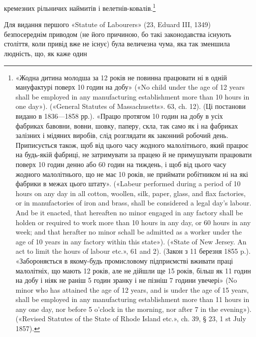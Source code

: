 кремезних рільничих наймитів і велетнів-ковалів.\footnote{
«Жодна дитина молодша за 12 років не повинна працювати ні в
одній мануфактурі поверх 10 годин на добу» («No child under the age
of 12 years shall be employed in any manufacturing establishment more
than 10 hours in one day»). («General Statutes of Massachusetts». 63, ch. 12).
(Ці постанови видано в 1836—1858 рр.). «Працю протягом 10 годин на
добу в усіх фабриках бавовни, вовни, шовку, паперу, скла, так само як
і на фабриках залізних і мідяних виробів, слід розглядати як законний
робочий день. Приписується також, щоб від цього часу жодного малолітнього,
який працює на будь-якій фабриці, не затримувати за працею й
не примушувати працювати поверх 10 годин денно або 60 годин на тиждень,
і щоб від цього часу жодного малолітнього, що не має 10 років, не приймати
робітником ні на які фабрики в межах цього штату». («Labeur performed
during a period of 10 hours on any day in all cotton, woollen, silk,
paper, glass, and flax factories, or in manufactories of iron and brass,
shall be considered a legal day’s labour. And be it enacted, that hereaften
no minor engaged in any factory shall be holden or required to work more
than 10 hours in any day, or 60 hours in any week; and that herafter no
minor schall be admitted as a worker under the age of 10 years in any factory
within this state»). («State of New Jersey. An act to limit the hours of labour
etc.», 61 and 2). (Закон з 11 березня 1855 p.). «Забороняється в якому-будь
промисловому підприємстві вживати праці малолітніх, що мають
12 років, але не дійшли ще 15 років, більш як 11 годин на добу і ніяк не
раніш 5 годин зранку і не пізніш 7 години увечері» (No minor who has
attained the age of 12 years, and is under the age of 15 years, shall be employed
in any manufacturing establishment more than 11 hours in any one day,
nor before 5 o’clock in the morning, nor after 7 in the evening»). («Revised
Statutes of the State of Rhode Island etc.», ch. 39, § 23, 1 st July 1857).
}

Для видання першого «Statute of Labourers» (23, Eduard
III, 1349) безпосереднім приводом (не його причиною, бо такі
законодавства існують століття, коли привід вже не існує) була
величезна чума, яка так зменшила людність, що, як каже один
\parbreak{}  %
